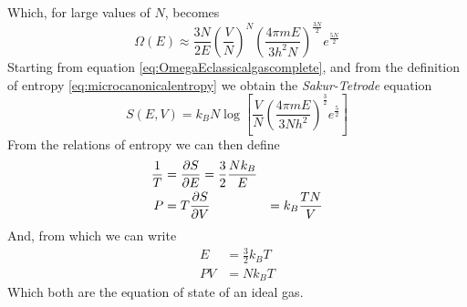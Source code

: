 \documentclass[../qm.tex]{subfiles}
\begin{document}
		Which, for large values of $N$, becomes
		\begin{equation}
			\Omega(E)\approx\frac{3N}{2E}\left( \frac{V}{N} \right)^N\left( \frac{4\pi mE}{3h^2N} \right)^{\frac{3N}{2}}e^{\frac{5N}{2}}
			\label{eq:OmegaEclassicalgaslargeN}
		\end{equation}
		Starting from equation \eqref{eq:OmegaEclassicalgascomplete}, and from the definition of entropy \eqref{eq:microcanonicalentropy} we obtain the \textit{Sakur-Tetrode} equation
		\begin{equation}
			S(E,V)=k_BN\log\left[ \frac{V}{N}\left( \frac{4\pi mE}{3Nh^2} \right)^{\frac{3}{2}}e^{\frac{5}{2}} \right]
			\label{eq:sakurtetrodeentropy}
		\end{equation}
		From the relations of entropy we can then define
		\begin{equation}
			\begin{aligned}
				\frac{1}{T}&=\pdv{S}{E}=\frac{3}{2}\frac{Nk_B}{E}\\
				P&=T\pdv{S}{V}&=k_B\frac{TN}{V}
			\end{aligned}
			\label{eq:tempminusonecg}
		\end{equation}
		And, from which we can write
		\begin{equation}
			\begin{aligned}
				E&=\frac{3}{2}k_BT\\
				PV&=Nk_BT
			\end{aligned}
			\label{eq:stateequationscg}
		\end{equation}
		Which both are the equation of state of an ideal gas.
\end{document}
